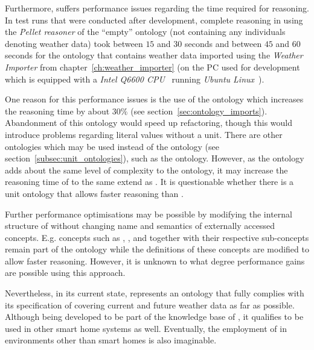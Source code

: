 Furthermore, \thinkhomeweather suffers performance issues regarding the time required for reasoning. In test runs that were conducted after development, complete reasoning in \protege using the \emph{Pellet reasoner} of the ``empty'' ontology (not containing any individuals denoting weather data) took between $15$ and $30$ seconds and between $45$ and $60$ seconds for the ontology that contains weather data imported using the \emph{Weather Importer} from chapter~\ref{ch:weather_importer} (on the PC used for development which is equipped with a \emph{Intel Q6600 CPU}~\cite{intel_q6600} running \emph{Ubuntu Linux}~\cite{ubuntu}).

One reason for this performance issues is the use of the \muo ontology which increases the reasoning time by about $30 \%$ (see section~\ref{sec:ontology_imports}). Abandonment of this ontology would speed up refactoring, though this would introduce problems regarding literal values without a unit. There are other ontologies which may be used instead of the \muo ontology (see section~\ref{subsec:unit_ontologies}), such as the  ontology. However, as the  ontology adds about the same level of complexity to the ontology, it may increase the reasoning time of \thinkhome to the same extend as \muo. It is questionable whether there is a unit ontology that allows faster reasoning than \muo.

Further performance optimisations may be possible by modifying the internal structure of \thinkhome without changing name and semantics of externally accessed concepts. E.g. concepts such as , , and  together with their respective sub-concepts remain part of the ontology while the definitions of these concepts are modified to allow faster reasoning. However, it is unknown to what degree performance gains are possible using this approach.

\vspace{1cm}

Nevertheless, in its current state, \thinkhomeweather represents an ontology that fully complies with its specification of covering current and future weather data as far as possible. Although being developed to be part of the knowledge base of \thinkhome, it qualifies to be used in other smart home systems as well. Eventually, the employment of \thinkhomeweather in environments other than smart homes is also imaginable.
